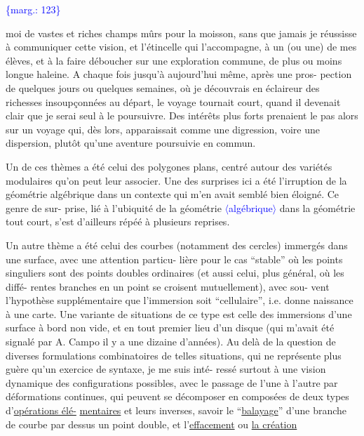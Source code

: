 \documentclass[11pt]{article}
\newcommand{\scanpage}[1]{\par\bigskip\noindent{\small\sffamily[scan #1]}\par}
\newcommand{\mspage}[1]{{\small\sffamily[p.\,#1]}}
\let\over\relax
\newcommand{\over}[2]{\textcolor{gray}{#1}\textcolor{blue}{\ensuremath{^{\!\nearrow}}#2}}
\newcommand{\inserted}[2][]{\textcolor{blue}{$\langle$#2$\rangle$}}
\newcommand{\margin}[1]{\textcolor{blue}{\{\textsf{marg.:} #1\}}}
\newcommand{\uline}[1]{\underline{#1}}
\begin{document}
\margin{123}

\clearpage
\scanpage{119/124}
\mspage{46}

moi de vastes et riches champs mûrs pour la moisson, sans que
jamais je réussisse à communiquer cette vision, et l'étincelle
qui l'accompagne, à un (ou une) de mes élèves, et à la faire
déboucher sur une exploration commune, de plus ou moins longue
haleine. A chaque fois jusqu'à aujourd'hui même, après une pros-%
pection de quelques jours ou quelques semaines, où je découvrais
en éclaireur des richesses insoupçonnées au départ, le voyage
tournait court, quand il devenait clair que je serai seul à le
poursuivre. Des intérêts plus forts prenaient le pas alors sur
un voyage qui, dès lors, apparaissait comme une digression, voire
une dispersion, plutôt qu'une aventure poursuivie en commun.

Un de ces thèmes a été celui des polygones plans, centré
autour des variétés modulaires qu'on peut leur associer. Une des
surprises ici a été l'irruption de la géométrie algébrique dans
un contexte qui m'en avait semblé bien éloigné. Ce genre de sur-%
prise, lié à l'ubiquité de la géométrie \inserted{algébrique} dans la géométrie tout
court, s'est d'ailleurs répé\over{r}{t}é à plusieurs reprises.

Un autre thème a été celui des courbes (notamment des
cercles) immergés dans une surface, avec une attention particu-%
lière pour le cas ``stable'' où les points singuliers sont des points
doubles ordinaires (et aussi celui, plus général, où les diffé-%
rentes branches en un point se croisent mutuellement), avec sou-%
vent l'hypothèse supplémentaire que l'immersion soit ``cellulaire'',
i.e. donne naissance à une carte. Une variante de situations de
ce type est celle des immersions d'une surface à bord non vide,
et en tout premier lieu d'un disque (qui m'avait été signalé par
A. Campo il y a une dizaine d'années). Au delà de la question de
diverses formulations combinatoires de telles situations, qui ne
représente plus guère qu'un exercice de syntaxe, je me suis inté-%
ressé surtout à une vision dynamique des configurations possibles,
avec le passage de l'une à l'autre par déformations continues, qui
peuvent se décomposer en composées de deux types d'\uline{opérations élé-}%
\uline{mentaires} et leurs inverses, savoir le ``\uline{balayage}'' d'une branche
de courbe par dessus un point double, et l'\uline{effacement} ou \uline{la création}
\end{document}

